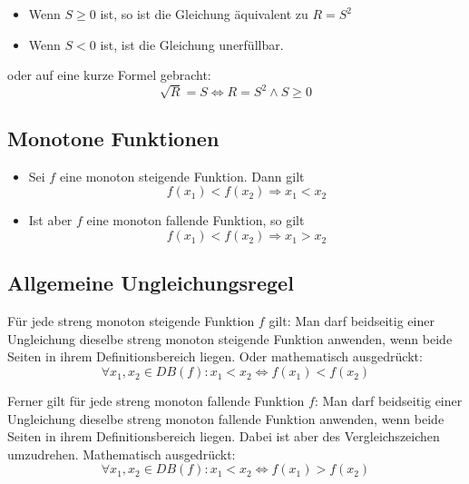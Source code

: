 \begin{itemize}
	\item Wenn $S \geq 0$ ist, so ist die Gleichung äquivalent zu $R = S^2$
	\item Wenn $S < 0$ ist, ist die Gleichung unerfüllbar.
\end{itemize}

oder auf eine kurze Formel gebracht:
\begin{displaymath}
	\sqrt{R} = S \Leftrightarrow R = S^2 \wedge S \geq 0
\end{displaymath}


\subsection{Monotone Funktionen}

\begin{itemize}
	\item Sei $f$ eine monoton steigende Funktion. Dann gilt
		\begin{displaymath}
			f(x_1) < f(x_2) \Rightarrow x_1 < x_2
		\end{displaymath}

	\item Ist aber $f$ eine monoton fallende Funktion, so gilt
		\begin{displaymath}
			f(x_1) < f(x_2) \Rightarrow x_1 > x_2
		\end{displaymath}
\end{itemize}


\subsection{Allgemeine Ungleichungsregel}

Für jede streng monoton steigende Funktion $f$ gilt: Man darf beidseitig einer Ungleichung dieselbe
streng monoton steigende Funktion anwenden, wenn beide Seiten in ihrem Definitionsbereich liegen.
Oder mathematisch ausgedrückt:
%
\begin{displaymath}
	\forall x_1, x_2 \in DB(f): x_1 < x_2 \Leftrightarrow f(x_1) < f(x_2)
\end{displaymath}

Ferner gilt für jede streng monoton fallende Funktion $f$: Man darf beidseitig einer Ungleichung
dieselbe streng monoton fallende Funktion anwenden, wenn beide Seiten in ihrem Definitionsbereich
liegen. Dabei ist aber des Vergleichszeichen umzudrehen. Mathematisch ausgedrückt:
%
\begin{displaymath}
	\forall x_1, x_2 \in DB(f): x_1 < x_2 \Leftrightarrow f(x_1) > f(x_2)
\end{displaymath}


